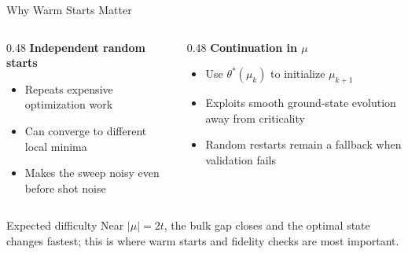 \documentclass[aspectratio=169,12pt]{beamer}
\begin{document}
\begin{frame}{Why Warm Starts Matter}
  \begin{columns}[T]
    \begin{column}{0.48\textwidth}
      \textbf{Independent random starts}
      \begin{itemize}
        \item Repeats expensive optimization work
        \item Can converge to different local minima
        \item Makes the sweep noisy even before shot noise
      \end{itemize}
    \end{column}
    \begin{column}{0.48\textwidth}
      \textbf{Continuation in $\mu$}
      \begin{itemize}
        \item Use $\theta^*(\mu_k)$ to initialize $\mu_{k+1}$
        \item Exploits smooth ground-state evolution away from criticality
        \item Random restarts remain a fallback when validation fails
      \end{itemize}
    \end{column}
  \end{columns}

  \begin{alertblock}{Expected difficulty}
    Near $|\mu|=2t$, the bulk gap closes and the optimal state changes fastest; this is where warm starts and fidelity checks are most important.
  \end{alertblock}
\end{frame}
\end{document}
